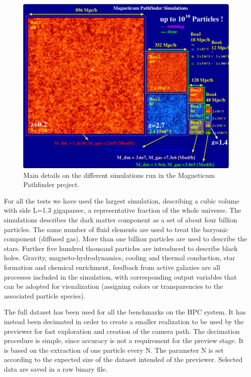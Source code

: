\documentclass{egpubl}
\begin{document}
\begin{figure}
\centering
\includegraphics[scale=0.33]{pathfinder.jpg}
\caption{Main details on the different simulations run in the Magneticum 
Pathfinder project.}
\label{fig:pathfinder}
\end{figure}

For all the tests we have used the largest simulation, describing a cubic volume
with side L=1.3 gigaparsec, a representative fraction of the whole universe.
The simulations describes the dark matter component as a set of about four billion particles. The 
same number of fluid elements are used to treat the baryonic component (diffused gas).
More than one billion particles are used to describe the stars. Further five hundred
thousand particles are introduced to describe black holes. Gravity, magneto-hydrodynamics,
cooling and thermal conduction, star formation and chemical enrichment, feedback from
active galaxies are all processes included in the simulation, with corresponding
output variables that can be adopted for visualization (assigning colors or transparencies
to the associated particle species).

The full dataset has been used for all the benchmarks on the HPC system. It has
instead been decimated in order to create a smaller realization to be
used by the previewer for fast exploration and creation of the camera path. The decimation
procedure is simple, since accuracy is not a requirement for the preview stage. It is based on the
extraction of one particle every N. The parameter N is set according to the expected size
of the dataset intended of the previewer. Selected data are saved in a raw binary file.
\end{document}
